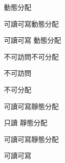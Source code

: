 \bTABLE
\setupTABLE[c][each][align={middle,lohi}]

\bTABLEhead
\bTR
\bTD \eTD
\bTD{}\eTD \bTD{}\eTD
\bTD{}\eTD \bTD{}\eTD
\eTR
\eTABLEhead

\bTABLEbody
\bTR
\bTD{}\eTD
\bTD 動態分配\par 可讀可寫\eTD \bTD 動態分配\par 可讀可寫\eTD
\bTD 動態分配\par 不可訪問\eTD \bTD 不可分配\par 不可訪問\eTD
\eTR

\bTR
\bTD{}\eTD
\bTD 不可分配\par 可讀可寫\eTD \bTD 靜態分配\par 只讀\eTD
\bTD 靜態分配\par 可讀可寫\eTD \bTD 靜態分配\par 可讀可寫\eTD
\eTR
\eTABLEbody

\eTABLE

